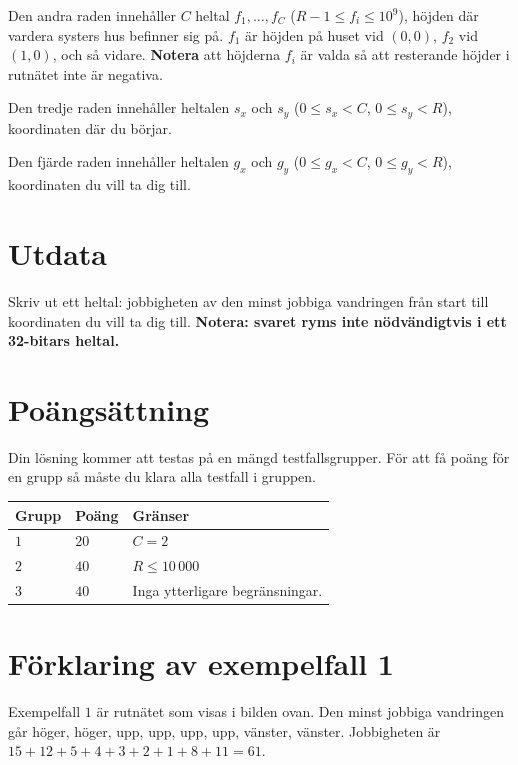 Den andra raden innehåller $C$ heltal $f_1, \dots, f_C$ ($R-1 \leq f_i \leq 10^9$),
höjden där vardera systers hus befinner sig på.
$f_1$ är höjden på huset vid $(0,0)$, $f_2$ vid $(1,0)$, och så vidare.
\textbf{Notera} att höjderna $f_i$ är valda så att resterande höjder i rutnätet inte är negativa.

Den tredje raden innehåller heltalen $s_x$ och $s_y$ ($0 \leq s_x < C$, $0 \leq s_y < R$),
koordinaten där du börjar.

Den fjärde raden innehåller heltalen $g_x$ och $g_y$ ($0 \leq g_x < C$, $0 \leq g_y < R$),
koordinaten du vill ta dig till.

\section*{Utdata}
Skriv ut ett heltal: jobbigheten av den minst jobbiga vandringen från start till koordinaten du vill ta dig till.
\textbf{Notera: svaret ryms inte nödvändigtvis i ett 32-bitars heltal.}

\section*{Poängsättning}
Din lösning kommer att testas på en mängd testfallsgrupper.
För att få poäng för en grupp så måste du klara alla testfall i gruppen.

\noindent
\begin{tabular}{| l | l | p{12cm} |}
  \hline
  \textbf{Grupp} & \textbf{Poäng} & \textbf{Gränser} \\ \hline
  $1$    & $20$  & $C = 2$ \\ \hline
  $2$    & $40$  & $R \leq 10\,000$ \\ \hline
  $3$    & $40$  & Inga ytterligare begränsningar. \\ \hline
\end{tabular}

\section*{Förklaring av exempelfall 1}
Exempelfall $1$ är rutnätet som visas i bilden ovan.
Den minst jobbiga vandringen går höger, höger, upp, upp, upp, upp, vänster, vänster.
Jobbigheten är $15+12+5+4+3+2+1+8+11=61$.
